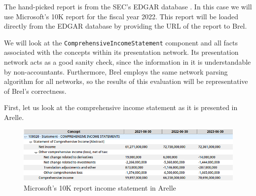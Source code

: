 
The hand-picked report is from the SEC's EDGAR database \cite{sec_edgar}.
In this case we will use Microsoft's 10K report for the fiscal year 2022\cite{microsoft_edgar}.
This report will be loaded directly from the EDGAR database by providing the URL of the report to Brel.

We will look at the \texttt{ComprehensiveIncomeStatement} component and all facts associated with the concepts within its presentation network.
Its presentation network acts as a good sanity check, since the information in it is understandable by non-accountants.
Furthermore, Brel employs the same network parsing algorithm for all networks, so the results of this evaluation will be representative of Brel's correctness.

First, let us look at the comprehensive income statement as it is presented in Arelle.

\begin{figure}[H]
  \centering
    \includegraphics[width=1\textwidth]{images/msft_income_statement_arelle.png}
    \caption{Microsoft's 10K report income statement in Arelle}
    \label{fig:msft_income_statement_arelle}
\end{figure}

